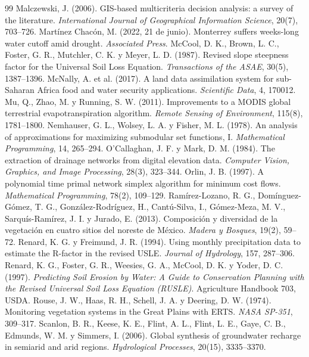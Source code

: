 \documentclass[11pt,letterpaper]{article}
\begin{document}
\begin{thebibliography}{99}
 Malczewski, J. (2006). GIS-based multicriteria decision analysis: a survey of the literature. \emph{International Journal of Geographical Information Science}, 20(7), 703–726.
 Martínez Chacón, M. (2022, 21 de junio). Monterrey suffers weeks-long water cutoff amid drought. \emph{Associated Press}.
 McCool, D. K., Brown, L. C., Foster, G. R., Mutchler, C. K. y Meyer, L. D. (1987). Revised slope steepness factor for the Universal Soil Loss Equation. \emph{Transactions of the ASAE}, 30(5), 1387–1396.
 McNally, A. et al. (2017). A land data assimilation system for sub-Saharan Africa food and water security applications. \emph{Scientific Data}, 4, 170012.
 Mu, Q., Zhao, M. y Running, S. W. (2011). Improvements to a MODIS global terrestrial evapotranspiration algorithm. \emph{Remote Sensing of Environment}, 115(8), 1781–1800.
 Nemhauser, G. L., Wolsey, L. A. y Fisher, M. L. (1978). An analysis of approximations for maximizing submodular set functions, I. \emph{Mathematical Programming}, 14, 265–294.
 O'Callaghan, J. F. y Mark, D. M. (1984). The extraction of drainage networks from digital elevation data. \emph{Computer Vision, Graphics, and Image Processing}, 28(3), 323–344.
 Orlin, J. B. (1997). A polynomial time primal network simplex algorithm for minimum cost flows. \emph{Mathematical Programming}, 78(2), 109–129.
 Ramírez-Lozano, R. G., Domínguez-Gómez, T. G., González-Rodríguez, H., Cantú-Silva, I., Gómez-Meza, M. V., Sarquís-Ramírez, J. I. y Jurado, E. (2013). Composición y diversidad de la vegetación en cuatro sitios del noreste de México. \emph{Madera y Bosques}, 19(2), 59–72.
 Renard, K. G. y Freimund, J. R. (1994). Using monthly precipitation data to estimate the R-factor in the revised USLE. \emph{Journal of Hydrology}, 157, 287–306.
 Renard, K. G., Foster, G. R., Weesies, G. A., McCool, D. K. y Yoder, D. C. (1997). \emph{Predicting Soil Erosion by Water: A Guide to Conservation Planning with the Revised Universal Soil Loss Equation (RUSLE)}. Agriculture Handbook 703, USDA.
 Rouse, J. W., Haas, R. H., Schell, J. A. y Deering, D. W. (1974). Monitoring vegetation systems in the Great Plains with ERTS. \emph{NASA SP-351}, 309–317.
 Scanlon, B. R., Keese, K. E., Flint, A. L., Flint, L. E., Gaye, C. B., Edmunds, W. M. y Simmers, I. (2006). Global synthesis of groundwater recharge in semiarid and arid regions. \emph{Hydrological Processes}, 20(15), 3335–3370.

\end{thebibliography}
\end{document}
